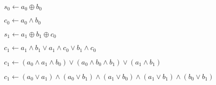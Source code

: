 \documentclass{beamer}
\renewcommand{\gets}{\leftarrow}
\newcommand{\AND}{\land}
\newcommand{\IOR}{\lor}
\newcommand{\XOR}{\oplus}
\begin{document}
\begin{frame}
$s_0 \gets a_0 \XOR b_0$

$c_0 \gets a_0 \AND b_0$

$s_1 \gets a_1 \XOR b_1 \XOR c_0$

$c_1 \gets a_1 \AND b_1 \IOR a_1 \AND c_0 \IOR b_1 \AND c_0$
\end{frame}

\begin{frame}
$c_1 \gets (a_0 \AND a_1 \AND b_0) \IOR (a_0 \AND b_0 \AND b_1) \IOR (a_1 \AND b_1)$ %

$c_1 \gets (a_0 \IOR a_1) \AND (a_0 \IOR b_1) \AND (a_1 \IOR b_0) \AND (a_1 \IOR b_1) \AND (b_0 \IOR b_1)$ %
\end{frame}

\begin{frame}
\begin{figure}

\end{figure}
\end{frame}

\begin{frame}
\begin{figure}

\end{figure}
\end{frame}

\begin{frame}
\begin{figure}

\end{figure}
\end{frame}

\begin{frame}
\begin{figure}

\end{figure}
\end{frame}

\begin{frame}
\begin{figure}

\end{figure}
\end{frame}

\begin{frame}
\begin{figure}

\end{figure}
\end{frame}

\begin{frame}
\begin{figure}

\end{figure}
\end{frame}
\end{document}
